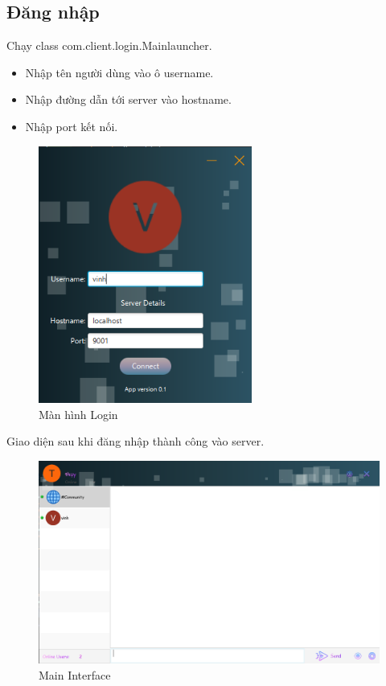 \documentclass[a4paper]{article}
\begin{document}
	\subsection{Đăng nhập}
	Chạy class com.client.login.Mainlauncher.

		
	\begin{itemize}
		\item Nhập tên người dùng vào ô username.
		\item Nhập đường dẫn tới server vào hostname.
		\item Nhập port kết nối.
	\end{itemize}
	\newpage
	\begin{figure}[h!]
		\centering
		\includegraphics[width=7cm]{LogIn.PNG}
		\caption{Màn hình Login}
		\label{fig:my_label}
	\end{figure}

	Giao diện sau khi đăng nhập thành công vào server.
	\begin{figure}[h!]
		\centering
		\includegraphics[width=13cm]{interface.PNG}
		\caption{Main Interface}
		\label{fig:my_label}
	\end{figure}
\end{document}
